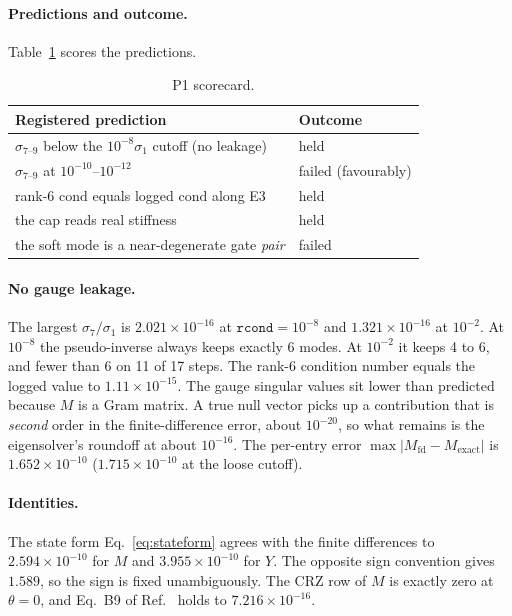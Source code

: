 \documentclass[aps,pra,reprint,superscriptaddress,nofootinbib]{revtex4-2}
\newcommand{\cond}{\mathrm{cond}}
\newcommand{\rcond}{\texttt{rcond}}
\begin{document}
\paragraph*{Predictions and outcome.} Table~\ref{tab:p1score} scores the predictions.
\begin{table}[t]
\caption{P1 scorecard.}
\label{tab:p1score}
\begin{ruledtabular}
\begin{tabular}{p{4.6cm}l}
Registered prediction & Outcome \\
\midrule
$\sigma_{7\text{--}9}$ below the $10^{-8}\sigma_1$ cutoff (no leakage) & held \\
$\sigma_{7\text{--}9}$ at $10^{-10}$--$10^{-12}$ & failed (favourably) \\
rank-6 $\cond$ equals logged $\cond$ along E3 & held \\
the cap reads real stiffness & held \\
the soft mode is a near-degenerate gate \emph{pair} & failed \\
\end{tabular}
\end{ruledtabular}
\end{table}

\paragraph*{No gauge leakage.} The largest $\sigma_7/\sigma_1$ is $2.021\times10^{-16}$ at
$\rcond=10^{-8}$ and $1.321\times10^{-16}$ at $10^{-2}$. At $10^{-8}$ the pseudo-inverse always
keeps exactly 6 modes. At $10^{-2}$ it keeps 4 to 6, and fewer than 6 on 11 of 17 steps. The
rank-6 condition number equals the logged value to $1.11\times10^{-15}$. The gauge singular
values sit lower than predicted because $M$ is a Gram matrix. A true null vector picks up a
contribution that is \emph{second} order in the finite-difference error, about $10^{-20}$,
so what remains is the eigensolver's roundoff at about $10^{-16}$. The per-entry error
$\max|M_{\mathrm{fd}}-M_{\mathrm{exact}}|$ is $1.652\times10^{-10}$ ($1.715\times10^{-10}$ at the
loose cutoff).

\paragraph*{Identities.} The state form Eq.~\eqref{eq:stateform} agrees with the finite
differences to $2.594\times10^{-10}$ for $M$ and $3.955\times10^{-10}$ for $Y$. The opposite sign
convention gives $1.589$, so the sign is fixed unambiguously. The CRZ row of $M$ is exactly zero
at $\theta=0$, and Eq.~B9 of Ref.~\cite{QDP2024} holds to $7.216\times10^{-16}$.
\end{document}

